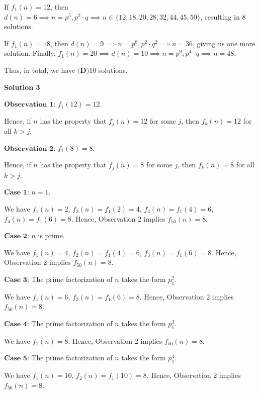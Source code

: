 \begin{enumerate}
 If $f_1(n) = 12$, then $d(n) = 6 \implies n = p^5, p^2 \cdot q \implies n \in \{ 12, 18, 20, 28, 32, 44, 45, 50 \}$, resulting in 8 solutions. 

 If $f_1(n) = 18$, then $d(n) = 9 \implies n = p^8, p^2 \cdot q^2 \implies n = 36$, giving us one more solution. Finally, $f_1(n) = 20 \implies d(n) = 10 \implies n = p^9, p^4 \cdot q \implies n = 48$. 

 Thus, in total, we have $\boxed{\textbf{(D)} 10}$ solutions.

 



\textbf{Solution 3}

$\textbf{Observation 1}$: $f_1 \left( 12 \right) = 12$.

 Hence, if $n$ has the property that $f_j \left( n \right) = 12$ for some $j$, then $f_k \left( n \right) = 12$ for all $k > j$.

 $\textbf{Observation 2}$: $f_1 \left( 8 \right) = 8$.

 Hence, if $n$ has the property that $f_j \left( n \right) = 8$ for some $j$, then $f_k \left( n \right) = 8$ for all $k > j$.

 $\textbf{Case 1}$: $n = 1$.

 We have $f_1 \left( n \right) = 2$, $f_2 \left( n \right) = f_1 \left( 2 \right) = 4$, $f_3 \left( n \right) = f_1 \left( 4 \right) = 6$, $f_4 \left( n \right) = f_1 \left( 6 \right) = 8$. Hence, Observation 2 implies $f_{50} \left( n \right) = 8$.

 $\textbf{Case 2}$: $n$ is prime.

 We have $f_1 \left( n \right) = 4$, $f_2 \left( n \right) = f_1 \left( 4 \right) = 6$, $f_3 \left( n \right) = f_1 \left( 6 \right) = 8$. Hence, Observation 2 implies $f_{50} \left( n \right) = 8$.

 $\textbf{Case 3}$: The prime factorization of $n$ takes the form $p_1^2$.

 We have $f_1 \left( n \right) = 6$, $f_2 \left( n \right) = f_1 \left( 6 \right) = 8$. Hence, Observation 2 implies $f_{50} \left( n \right) = 8$.

 $\textbf{Case 4}$: The prime factorization of $n$ takes the form $p_1^3$.

 We have $f_1 \left( n \right) = 8$. Hence, Observation 2 implies $f_{50} \left( n \right) = 8$.

 $\textbf{Case 5}$: The prime factorization of $n$ takes the form $p_1^4$.

 We have $f_1 \left( n \right) = 10$, $f_2 \left( n \right) = f_1 \left( 10 \right) = 8$. Hence, Observation 2 implies $f_{50} \left( n \right) = 8$.


\end{enumerate}
